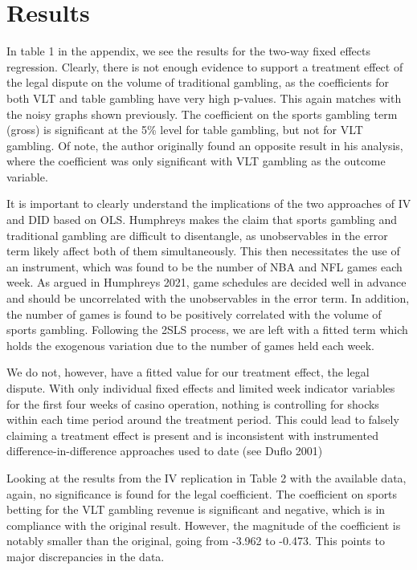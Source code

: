 \documentclass{article}
\begin{document}
\section*{Results}

In table 1 in the appendix, we see the results for the two-way fixed effects regression. Clearly, there is not enough evidence to support a treatment effect of the legal dispute on the volume of traditional gambling, as the coefficients for both VLT and table gambling have very high p-values. This again matches with the noisy graphs shown previously. The coefficient on the sports gambling term (gross) is significant at the 5\% level for table gambling, but not for VLT gambling. Of note, the author originally found an opposite result in his analysis, where the coefficient was only significant with VLT gambling as the outcome variable.

It is important to clearly understand the implications of the two approaches of IV and DID based on OLS. Humphreys makes the claim that sports gambling and traditional gambling are difficult to disentangle, as unobservables in the error term likely affect both of them simultaneously. This then necessitates the use of an instrument, which was found to be the number of NBA and NFL games each week. As argued in Humphreys 2021, \cite{Humphreys2021}game schedules are decided well in advance and should be uncorrelated with the unobservables in the error term. In addition, the number of games is found to be positively correlated with the volume of sports gambling. Following the 2SLS process, we are left with a fitted term which holds the exogenous variation due to the number of games held each week.

We do not, however, have a fitted value for our treatment effect, the legal dispute. With only individual fixed effects and limited week indicator variables for the first four weeks of casino operation, nothing is controlling for shocks within each time period around the treatment period. This could lead to falsely claiming a treatment effect is present and is inconsistent with instrumented difference-in-difference approaches used to date (see Duflo 2001\cite{Duflo2001})


Looking at the results from the IV replication in Table 2 with the available data, again, no significance is found for the legal coefficient. The coefficient on sports betting for the VLT gambling revenue is significant and negative, which is in compliance with the original result. However, the magnitude of the coefficient is notably smaller than the original, going from -3.962 to -0.473. This points to major discrepancies in the data.
\end{document}
